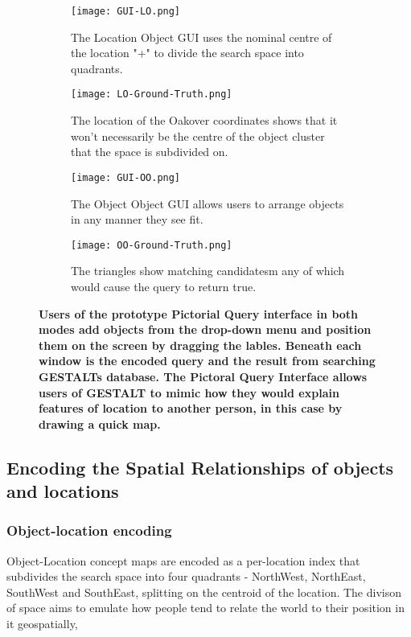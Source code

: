 \begin{figure*}[h]
    \centering
    \begin{subfigure}[t]{.2\textwidth} 
        \texttt{[image: GUI-LO.png]}
        \caption{\small The Location Object GUI uses the nominal centre of the location "+" to divide the search space into quadrants.}
        \label{fig:GUI-LO}
    \end{subfigure}
    \hfill
    \begin{subfigure}[t]{.2\textwidth} 
        \texttt{[image: LO-Ground-Truth.png]}
        \caption{\small The location of the Oakover coordinates shows that it won't necessarily be the centre of the object cluster that the space is subdivided on.}
        \label{fig:LO-Ground-Truth}
    \end{subfigure}
    \hfill
    \begin{subfigure}[t]{.2\textwidth}
        \texttt{[image: GUI-OO.png]}
        \caption{\small The Object Object GUI allows users to arrange objects in any manner they see fit.}
        \label{fig:GUI-OO}
    \end{subfigure}
    \begin{subfigure}[t]{.2\textwidth} 
        \texttt{[image: OO-Ground-Truth.png]}
        \caption{\small The triangles show matching candidatesm any of which would cause the query to return true.}
        \label{fig:OO-Ground-Truth}
    \end{subfigure}
    \hfill
    \caption{\textbf{Users of the prototype Pictorial Query interface in both modes add objects from the drop-down menu and position them on the screen by dragging the lables. Beneath each window is the encoded query and the result from searching GESTALTs database. The Pictoral Query Interface allows users of GESTALT to mimic how they would explain features of location to another person, in this case by drawing a quick map.}}\label{figure:GUI} 
\end{figure*}

\subsection{Encoding the Spatial Relationships of objects and locations}

\subsubsection{Object-location encoding}
Object-Location concept maps are encoded as a per-location index that subdivides the search space into four quadrants - NorthWest, NorthEast, SouthWest and SouthEast, splitting on the centroid of the location. The divison of space aims to emulate how people tend to relate the world to their position in it geospatially, 


